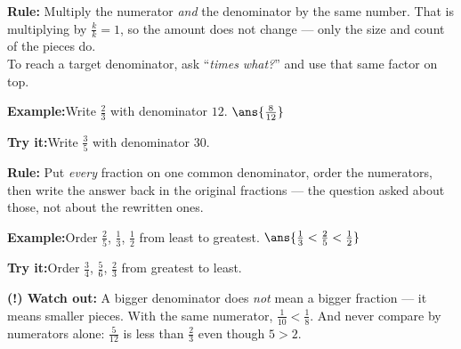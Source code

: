 \documentclass[12pt]{article}
\begin{document}
\begin{formulabox}
\textbf{Rule:} Multiply the numerator \emph{and} the denominator by the same
number. That is multiplying by $\frac{k}{k} = 1$, so the amount does not
change --- only the size and count of the pieces do.\\[3pt]
To reach a target denominator, ask ``\emph{times what?}'' and use that same
factor on top.
\end{formulabox}
\begin{examplebox}
\textbf{Example:}\quad Write $\frac{2}{3}$ with denominator $12$.
$\ans{\frac{8}{12}}$
\end{examplebox}
\begin{tryitbox}
\textbf{Try it:}\quad Write $\frac{3}{5}$ with denominator $30$.\\[2pt]
\end{tryitbox}

\begin{formulabox}
\textbf{Rule:} Put \emph{every} fraction on one common denominator, order the
numerators, then write the answer back in the original fractions --- the
question asked about those, not about the rewritten ones.
\end{formulabox}
\begin{examplebox}
\textbf{Example:}\quad Order $\frac{2}{5}$, $\frac{1}{3}$, $\frac{1}{2}$ from
least to greatest.
$\ans{\frac{1}{3} < \frac{2}{5} < \frac{1}{2}}$
\end{examplebox}
\begin{tryitbox}
\textbf{Try it:}\quad Order $\frac{3}{4}$, $\frac{5}{6}$, $\frac{2}{3}$ from
greatest to least.\\[2pt]
\end{tryitbox}

\begin{watchoutbox}
\textbf{(!) Watch out:} A bigger denominator does \emph{not} mean a bigger
fraction --- it means smaller pieces. With the same numerator,
$\frac{1}{10} < \frac{1}{8}$. And never compare by numerators alone:
$\frac{5}{12}$ is less than $\frac{2}{3}$ even though $5 > 2$.
\end{watchoutbox}
\end{document}
